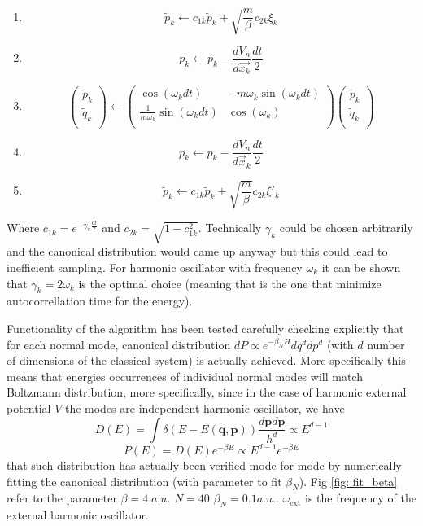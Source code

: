 \documentclass[10pt,a4paper]{article}
\begin{document}
\begin{enumerate}
	\item \[\tilde{p}_k \leftarrow c_{1k}\tilde{p}_k + \sqrt{\frac{m}{\beta}}c_{2k} \xi_k \]
	\item \[p_k \leftarrow p_k - \frac{dV_n}{d\vec{x_k}}\frac{dt}{2}\]
	\item 
	\begin{equation}
	\begin{pmatrix} 
	\tilde{p}_k  \\
	\tilde{q}_k \\
	\end{pmatrix} 
	\leftarrow
	\begin{pmatrix} 
	\cos(\omega_k dt) & -m\omega_k \sin(\omega_k dt)   \\
	\frac{1}{m\omega_k}\sin(\omega_k dt) & \cos(\omega_k)  \\
	\end{pmatrix} 
	\begin{pmatrix} 
	\tilde{p}_k  \\
	\tilde{q}_k \\
	\end{pmatrix} 
	\end{equation}
	\item \[ p_k \leftarrow p_k - \frac{dV_n}{d\vec{x}_k}\frac{dt}{2}\]
	\item \[\tilde{p}_k \leftarrow c_{1k}\tilde{p}_k + \sqrt{\frac{m}{\beta}}c_{2k} \xi'_k \]
\end{enumerate}
Where $c_{1k} = e^{-\gamma_k \frac{dt}{2}}$ and $c_{2k}=\sqrt{1-c_{1k}^2}$. Technically $\gamma_k$ could be chosen arbitrarily and the canonical distribution would came up anyway but this could lead to inefficient sampling. 
For harmonic oscillator with frequency $\omega_k$ it can be shown that $\gamma_k = 2\omega_k$ is the optimal choice (meaning that is the one that minimize autocorrellation time for the energy).
\newline

Functionality of the algorithm has been tested carefully checking explicitly that for each normal mode, canonical distribution $dP \propto e^{-\beta_N H}dq^ddp^d$ (with $d$ number of dimensions of the classical system) is actually achieved.
More specifically this means that energies occurrences of individual normal modes will match Boltzmann distribution, more specifically, since in the case of harmonic external potential $V$ the modes are independent harmonic oscillator, we have
\[D(E)= \int \delta(E-E(\bm q,\bm p)) \frac{d\bm p d\bm p}{h^d} \propto E^{d-1}  \] 
\[ P(E) = D(E)e^{-\beta E}\propto E^{d-1}e^{-\beta E}  \]
that such distribution has actually been verified mode for mode by numerically fitting the canonical distribution (with parameter to fit $\beta_N$).
Fig \ref{fig: fit_beta} refer to the parameter $\beta=4. a.u.$ $N = 40$ $\beta_N=0.1 a.u.$. $\omega_{\text{ext}}$ is the frequency of the external harmonic oscillator.
\end{document}
